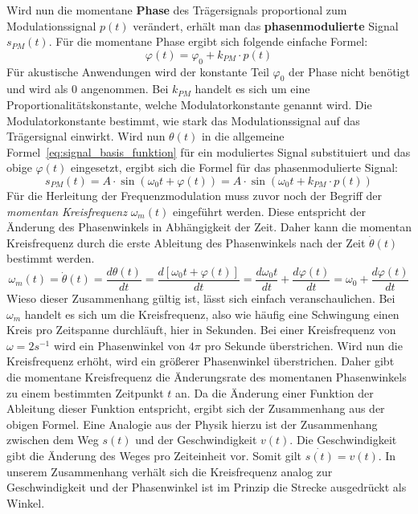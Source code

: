 Wird nun die momentane \textbf{Phase} des Trägersignals proportional zum Modulationssignal \(p(t)\) verändert, erhält man das \textbf{phasenmodulierte} Signal \(s_{PM}(t)\). \cite[S. 209]{lathi}
Für die momentane Phase ergibt sich folgende einfache Formel:
\begin{equation}
\varphi(t)=\varphi_0+k_{PM}\cdot p(t)
\label{eq:varphi_t}
\end{equation}
Für akustische Anwendungen wird der konstante Teil \(\varphi_0\) der Phase nicht benötigt und wird als 0 angenommen. Bei \(k_{PM}\) handelt es sich um eine Proportionalitätskonstante, welche Modulatorkonstante genannt wird. Die Modulatorkonstante bestimmt, wie stark das Modulationssignal auf das Trägersignal einwirkt. Wird nun \(\theta(t)\) in die allgemeine Formel~\ref{eq:signal_basis_funktion} für ein moduliertes Signal substituiert und das obige \(\varphi(t)\) eingesetzt, ergibt sich die Formel für das phasenmodulierte Signal:
\begin{equation}
s_{PM}(t)=A\cdot\sin(\omega_0t + \varphi(t))=A\cdot\sin(\omega_0t+k_{PM}\cdot p(t))
\label{eq:s_pm}
\end{equation}
Für die Herleitung der Frequenzmodulation muss zuvor noch der Begriff der \textit{momentan Kreisfrequenz} \(\omega_m(t)\) eingeführt werden.
Diese entspricht der Änderung des Phasenwinkels in Abhängigkeit der Zeit. Daher kann die momentan Kreisfrequenz durch die erste Ableitung des Phasenwinkels nach der Zeit $\dot \theta(t)$ bestimmt werden. \cite[S. 209]{lathi}
\begin{equation}
\omega_m(t)=\dot \theta(t)=\frac{d\theta(t)}{dt}=\frac{d[\omega_0t+\varphi(t)]}{dt}=\frac{d\omega_0t}{dt}+\frac{d\varphi(t)}{dt}=\omega_0+\frac{d\varphi(t)}{dt}
\label{eq:omega_m_herleitung}
\end{equation}
Wieso dieser Zusammenhang gültig ist, lässt sich einfach veranschaulichen. Bei \(\omega_m\) handelt es sich um die Kreisfrequenz, also wie häufig eine Schwingung einen Kreis pro Zeitspanne durchläuft, hier in Sekunden. Bei einer Kreisfrequenz von \(\omega=2 s^{-1}\) wird ein Phasenwinkel von \(4\pi\) pro Sekunde überstrichen. Wird nun die Kreisfrequenz erhöht, wird ein größerer Phasenwinkel überstrichen. Daher gibt die momentane Kreisfrequenz die Änderungsrate des momentanen Phasenwinkels zu einem bestimmten Zeitpunkt \(t\) an. Da die Änderung einer Funktion der Ableitung dieser Funktion entspricht, ergibt sich der Zusammenhang aus der obigen Formel. Eine Analogie aus der Physik hierzu ist der Zusammenhang zwischen dem Weg \(s(t)\) und der Geschwindigkeit \(v(t)\). Die Geschwindigkeit gibt die Änderung des Weges pro Zeiteinheit vor. Somit gilt \(\dot{s(t)}=v(t)\). In unserem Zusammenhang verhält sich die Kreisfrequenz analog zur Geschwindigkeit und der Phasenwinkel ist im Prinzip die Strecke ausgedrückt als Winkel.

